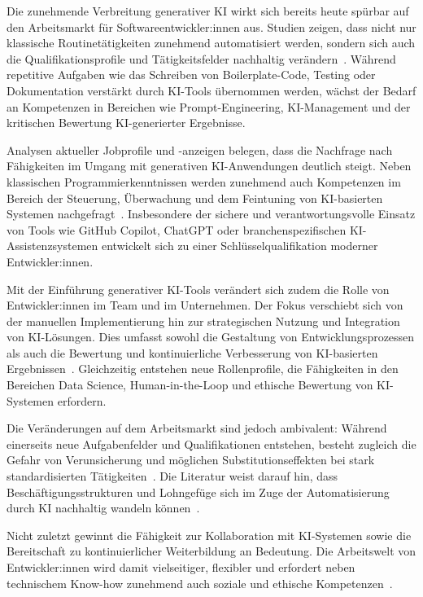 
Die zunehmende Verbreitung generativer KI wirkt sich bereits heute spürbar auf
den Arbeitsmarkt für Softwareentwickler:innen aus. Studien zeigen, dass nicht
nur klassische Routinetätigkeiten zunehmend automatisiert werden, sondern sich
auch die Qualifikationsprofile und Tätigkeitsfelder nachhaltig
verändern~\cite{siebert_generative_2024,braun_ki_2024,deloitte_future_2024}.
Während repetitive Aufgaben wie das Schreiben von Boilerplate-Code, Testing
oder Dokumentation verstärkt durch KI-Tools übernommen werden, wächst der
Bedarf an Kompetenzen in Bereichen wie Prompt-Engineering, KI-Management und
der kritischen Bewertung KI-generierter Ergebnisse.

Analysen aktueller Jobprofile und -anzeigen belegen, dass die Nachfrage nach
Fähigkeiten im Umgang mit generativen KI-Anwendungen deutlich steigt. Neben
klassischen Programmierkenntnissen werden zunehmend auch Kompetenzen im Bereich
der Steuerung, Überwachung und dem Feintuning von KI-basierten Systemen
nachgefragt~\cite{ahmadi_jobmarket_2024}. Insbesondere der sichere und
verantwortungsvolle Einsatz von Tools wie GitHub Copilot, ChatGPT oder
branchenspezifischen KI-Assistenzsystemen entwickelt sich zu einer
Schlüsselqualifikation moderner Entwickler:innen.

Mit der Einführung generativer KI-Tools verändert sich zudem die Rolle von
Entwickler:innen im Team und im Unternehmen. Der Fokus verschiebt sich von der
manuellen Implementierung hin zur strategischen Nutzung und Integration von
KI-Lösungen. Dies umfasst sowohl die Gestaltung von Entwicklungsprozessen als
auch die Bewertung und kontinuierliche Verbesserung von KI-basierten
Ergebnissen~\cite{storey_developer_2023}. Gleichzeitig entstehen neue
Rollenprofile, die Fähigkeiten in den Bereichen Data Science, Human-in-the-Loop
und ethische Bewertung von KI-Systemen erfordern.

Die Veränderungen auf dem Arbeitsmarkt sind jedoch ambivalent: Während
einerseits neue Aufgabenfelder und Qualifikationen entstehen, besteht zugleich
die Gefahr von Verunsicherung und möglichen Substitutionseffekten bei stark
standardisierten Tätigkeiten~\cite{farach_digital_2024}. Die Literatur weist
darauf hin, dass Beschäftigungsstrukturen und Lohngefüge sich im Zuge der
Automatisierung durch KI nachhaltig wandeln
können~\cite{marguerit_aiwork_2024}.

Nicht zuletzt gewinnt die Fähigkeit zur Kollaboration mit KI-Systemen sowie die
Bereitschaft zu kontinuierlicher Weiterbildung an Bedeutung. Die Arbeitswelt
von Entwickler:innen wird damit vielseitiger, flexibler und erfordert neben
technischem Know-how zunehmend auch soziale und ethische
Kompetenzen~\cite{storey_developer_2023,siebert_generative_2024}.

